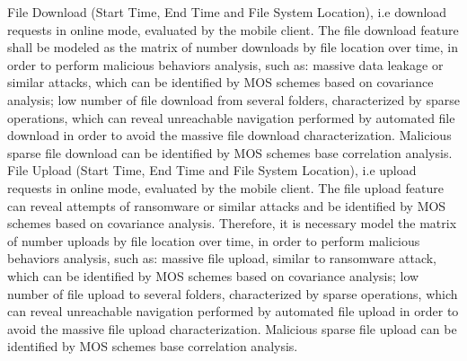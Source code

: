 \documentclass[twocolumn]{svjour3}          %
\begin{document}
File Download (Start Time, End Time and File System Location), i.e download requests in online mode, evaluated by the mobile client. The file download feature shall be modeled as the matrix of number downloads by file location over time, in order to perform malicious behaviors analysis, such as:
massive data leakage or similar attacks, which can be identified by MOS schemes based on covariance analysis; 
low number of file download from several folders, characterized by sparse operations, which can reveal unreachable navigation performed by automated file download in order to avoid the massive file download characterization. Malicious sparse file download can be identified by MOS schemes base correlation analysis.
File Upload (Start Time, End Time and File System Location), i.e upload requests in online mode, evaluated by the mobile client. The file upload feature can reveal attempts of ransomware or similar attacks and be identified by MOS schemes based on covariance analysis. Therefore, it is necessary model the matrix of number uploads by file location over time, in order to perform malicious behaviors analysis, such as:
massive file upload, similar to ransomware attack, which can be identified by MOS schemes based on covariance analysis; 
low number of file upload to several folders, characterized by sparse operations, which can reveal unreachable navigation performed by automated file upload in order to avoid the massive file upload characterization. Malicious sparse file upload can be identified by MOS schemes base correlation analysis.
\end{document}
